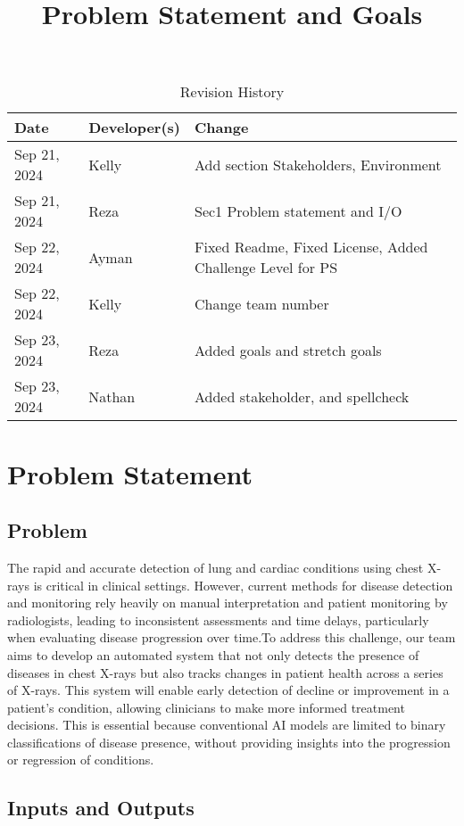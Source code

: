 \documentclass{article}
\title{Problem Statement and Goals\\\progname}
\author{\authname}
\date{}
\begin{document}
\maketitle

\begin{table}[hp]
\caption{Revision History} \label{TblRevisionHistory}
\begin{tabularx}{\textwidth}{llX}
\toprule
\textbf{Date} & \textbf{Developer(s)} & \textbf{Change}\\
\midrule
Sep 21, 2024 & Kelly & Add section Stakeholders, Environment\\
Sep 21, 2024 & Reza & Sec1 Problem statement and I/O\\
Sep 22, 2024 & Ayman & Fixed Readme, Fixed License, Added Challenge Level for PS\\
Sep 22, 2024 & Kelly & Change team number\\
Sep 23, 2024 & Reza & Added goals and stretch goals\\
Sep 23, 2024 & Nathan & Added stakeholder, and spellcheck\\
\bottomrule
\end{tabularx}
\end{table}
\newpage
\section{Problem Statement}
\subsection{Problem}
The rapid and accurate detection of lung and cardiac conditions using chest X-rays is critical in clinical settings. However, current methods for disease detection and monitoring rely heavily on manual interpretation and patient monitoring by radiologists, leading to inconsistent assessments and time delays, particularly when evaluating disease progression over time.To address this challenge, our team aims to develop an automated system that not only detects the presence of diseases in chest X-rays but also tracks changes in patient health across a series of X-rays. This system will enable early detection of decline or improvement in a patient's condition, allowing clinicians to make more informed treatment decisions. This is essential because conventional AI models are limited to binary classifications of disease presence, without providing insights into the progression or regression of conditions.
\subsection{Inputs and Outputs}
\end{document}
